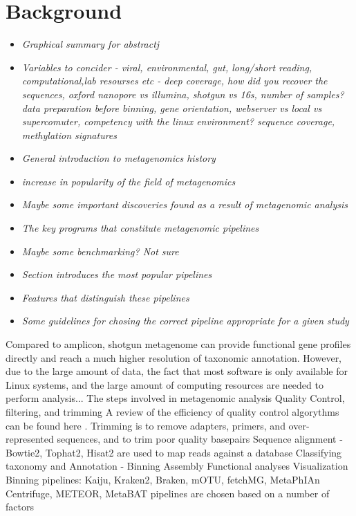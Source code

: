 \documentclass{article}
\begin{document}
\section{Background}
\begin{itemize}
	\item \emph{Graphical summary for abstractj}
	\item \emph{Variables to concider - viral, environmental, gut, long/short reading, computational,lab resourses etc - deep coverage, how did you recover the sequences, oxford nanopore vs illumina, shotgun vs 16s, number of samples? data preparation before binning, gene orientation, webserver vs local vs supercomuter, competency with the linux environment? sequence coverage, methylation signatures}
	\item \emph{General introduction to metagenomics history }
	\item \emph{increase in popularity of the field of metagenomics}
	\item \emph{Maybe some important discoveries found as a result of metagenomic analysis}
	\item \emph{The key programs that constitute metagenomic pipelines}
	\item \emph{Maybe some benchmarking? Not sure}
	\item \emph{Section introduces the most popular pipelines}
	\item \emph{Features that distinguish these pipelines}
	\item \emph{Some guidelines for chosing the correct pipeline appropriate for a given study}
\end{itemize}
Compared to amplicon, shotgun metagenome can provide functional gene profiles directly and reach a much higher resolution of taxonomic annotation.
However, due to the large amount of data, the fact that most software is only available for Linux systems, and the large amount of computing resources are needed to perform analysis...
The steps involved in metagenomic analysis
Quality Control, filtering, and trimming
A review of the efficiency of quality control algorythms can be found here \cite{zhou2014assessment}.
Trimming is to remove adapters, primers, and over-represented sequences, and to trim poor quality basepairs
Sequence alignment - Bowtie2, Tophat2, Hisat2 are used to map reads against a database
Classifying taxonomy and Annotation - Binning
Assembly
Functional analyses
Visualization
Binning pipelines: Kaiju, Kraken2, Braken, mOTU, fetchMG, MetaPhIAn Centrifuge, METEOR, MetaBAT
pipelines are chosen based on a number of factors
\end{document}

